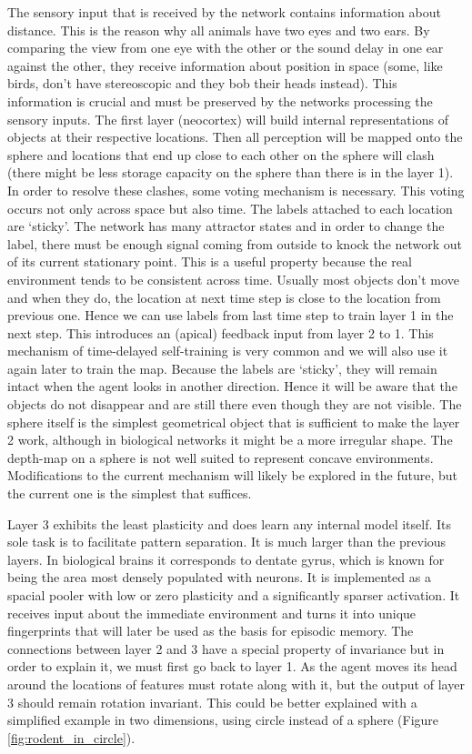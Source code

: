 \documentclass[12pt]{article}
\begin{document}
The sensory input that is received by the network contains information about distance. This is the reason why all animals have two eyes and two ears. By comparing the view from one eye with the other or the sound delay in one ear against the other, they receive information about position in space (some, like birds, don't have stereoscopic and they bob their heads instead). This information is crucial and must be preserved by the networks processing the sensory inputs.  The first layer (neocortex) will build internal representations of objects at their respective locations. Then all perception will be mapped onto the sphere and locations that end up close to each other on the sphere will clash (there might be less storage capacity on the sphere than there is in the layer 1). In order to resolve these clashes, some voting mechanism is necessary. This voting occurs not only across space but also time. The labels attached to each location are `sticky'. The network has many attractor states and in order to change the label, there must be enough signal coming from outside to knock the network out of its current stationary point. This is a useful property because the real environment tends to be consistent across time. Usually most objects don't move and when they do, the location at next time step is close to the location from previous one. Hence we can use labels from last time step to train layer 1 in the next step. This introduces an (apical) feedback input from layer 2 to 1.
This mechanism of time-delayed self-training is very common and we will also use it again later to train the map.
Because the labels are `sticky', they will remain intact when the agent looks in another direction. Hence it will be aware that the objects do not disappear and are still there even though they are not visible. The sphere itself is the simplest geometrical object that is sufficient to make the layer 2 work, although in biological networks it might be a more irregular shape. The depth-map on a sphere is not well suited to represent concave environments. Modifications to the current mechanism will likely be explored in the future, but the current one is the simplest that suffices. 

Layer 3 exhibits the least plasticity and does learn any internal model itself. Its sole task is to facilitate pattern separation. It is much larger than the previous layers. In biological brains it corresponds to dentate gyrus, which is known for being the area most densely populated with neurons. It is implemented as a spacial pooler with low or zero plasticity and a significantly sparser activation. It receives input about the immediate environment and turns it into unique fingerprints that will later be used as the basis for episodic memory.  The connections between layer 2 and 3 have a special property of invariance but in order to explain it, we must first go back to layer 1. As the agent moves its head around the locations of features must rotate along with it, but the output of layer 3 should remain rotation invariant. This could be better explained with a simplified example in two dimensions, using circle instead of a sphere (Figure \ref{fig:rodent_in_circle}). 
\end{document}
